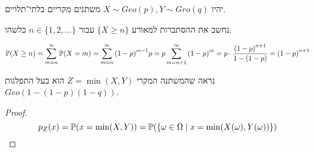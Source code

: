 \Question{}
יהיו $X \sim Geo(p), Y \sim Gro(q)$ משתנים מקריים בלתי־תלויים.

\Subquestion{}
נחשב את ההסתברות למאורע $\{X \ge n \}$ עבור $n \in \{1, 2, \dots\}$ כלשהו.
\begin{solution}
	\[
		\mathbb{P}(X \ge n)
		= \sum_{m = n}^\infty \mathbb{P}(X = m)
		= \sum_{m = n}^\infty {(1 - p)}^{m - 1} p
		= p \sum_{m = n + 1}^\infty {(1 - p)}^m
		= p \cdot \frac{{(1 - p)}^{n + 1}}{1 - (1 - p)}
		= {(1 - p)}^{n + 1}
	\]
\end{solution}

\Subquestion{}
נראה שהמשתנה המקרי $Z = \min(X, Y)$ הוא בעל התפלגות $Geo(1 - (1 - p)(1 - q))$.
\begin{proof}
	\[
		p_Z(x)
		= \mathbb{P}(x = \min(X, Y))
		= \mathbb{P}(\{\omega \in \Omega \mid x = \min(X(\omega), Y(\omega))\})
	\]
\end{proof}



